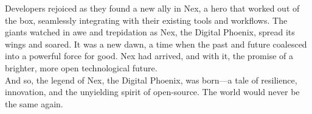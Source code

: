 Developers rejoiced as they found a new ally in Nex, a hero that worked out of the box, seamlessly integrating with their existing tools and workflows.
The giants watched in awe and trepidation as Nex, the Digital Phoenix, spread its wings and soared.
It was a new dawn, a time when the past and future coalesced into a powerful force for good.
Nex had arrived, and with it, the promise of a brighter, more open technological future.
\\

And so, the legend of Nex, the Digital Phoenix, was born—a tale of resilience, innovation, and the unyielding spirit of open-source.
The world would never be the same again.
\\

